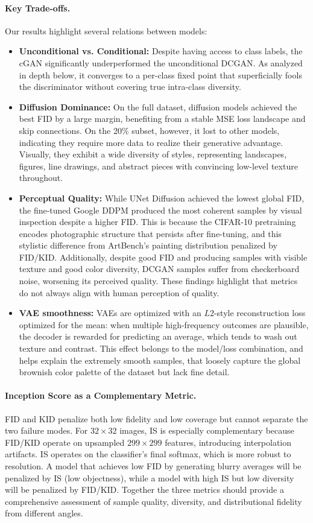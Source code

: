\documentclass[runningheads]{llncs}
\begin{document}
\paragraph{Key Trade-offs.}
Our results highlight several relations between models:
\begin{itemize}
    \item \textbf{Unconditional vs. Conditional:} Despite having access to class labels, the cGAN significantly underperformed the unconditional DCGAN. As analyzed in depth below, it converges to a per-class fixed point that superficially fools the discriminator without covering true intra-class diversity.
    \item \textbf{Diffusion Dominance:} On the full dataset, diffusion models achieved the best FID by a large margin, benefiting from a stable MSE loss landscape and skip connections. On the 20\% subset, however, it lost to other models, indicating they require more data to realize their generative advantage. Visually, they exhibit a wide diversity of styles, representing landscapes, figures, line drawings, and abstract pieces with convincing low-level texture throughout.
    \item \textbf{Perceptual Quality:} While UNet Diffusion achieved the lowest global FID, the fine-tuned Google DDPM produced the most coherent samples by visual inspection despite a higher FID. This is because the CIFAR-10 pretraining encodes photographic structure that persists after fine-tuning, and this stylistic difference from ArtBench's painting distribution penalized by FID/KID. Additionally, despite good FID and producing samples with visible texture and good color diversity, DCGAN samples suffer from checkerboard noise, worsening its perceived quality. These findings highlight that metrics do not always align with human perception of quality.
    \item \textbf{VAE smoothness:} VAEs are optimized with an $L2$-style reconstruction loss optimized for the mean: when multiple high-frequency outcomes are plausible, the decoder is rewarded for predicting an average, which tends to wash out texture and contrast. This effect belongs to the model/loss combination, and helps explain the extremely smooth samples, that loosely capture the global brownish color palette of the dataset but lack fine detail.
\end{itemize}

\paragraph{Inception Score as a Complementary Metric.}
FID and KID penalize both low fidelity and low coverage but cannot separate the two failure modes. For $32\times32$ images, IS is especially complementary because FID/KID operate on upsampled $299\times299$ features, introducing interpolation artifacts. IS operates on the classifier's final softmax, which is more robust to resolution. A model that achieves low FID by generating blurry averages will be penalized by IS (low objectness), while a model with high IS but low diversity will be penalized by FID/KID. Together the three metrics should provide a comprehensive assessment of sample quality, diversity, and distributional fidelity from different angles.
\end{document}
